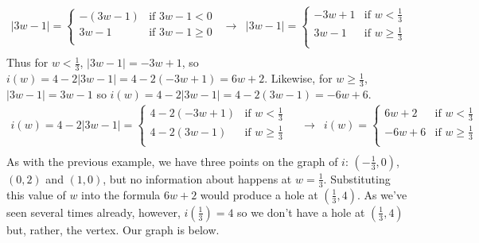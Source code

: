 \documentclass{ximera}
\begin{document}
\begin{example}
\begin{enumerate}
\[\begin{array}{ccc}
 |3w - 1|  = \begin{cases} 
      -(3w - 1) &  \text{if $3w - 1  < 0$} \\
     3w - 1  & \text{if $3w - 1 \geq 0$} \\
   \end{cases}
   
 &
 
 \longrightarrow
 
 &
 
 |3w - 1|  =   \begin{cases} 
     -3w + 1 &  \text{if $w <  {\textstyle \frac{1}{3}}$ } \\
    3w - 1  & \text{if $w \geq  {\textstyle \frac{1}{3}}$} \\
   \end{cases} \\ 
   
   \end{array}  \] Thus for $w <  \frac{1}{3}$, $|3w - 1| = -3w + 1$, so $i(w) = 4 - 2|3w - 1| = 4 - 2(-3w + 1) = 6w + 2$.  Likewise, for $w \geq  \frac{1}{3}$, $|3w - 1| = 3w - 1$ so $i(w) = 4 - 2|3w - 1|  = 4 - 2(3w - 1) = -6w + 6$. \[ \begin{array}{ccc}

 i(w)  =  4 - 2 |3w - 1| =  \begin{cases} 
    4 - 2(-3w + 1) &  \text{if $w < {\textstyle \frac{1}{3}}$ } \\
   4 - 2(3w - 1)  & \text{if $w \geq {\textstyle \frac{1}{3}}$} \\
   \end{cases} 
   
 &
 
 \longrightarrow
 
 &
 
i(w)  =   \begin{cases} 
    6w + 2  &  \text{if $w < {\textstyle \frac{1}{3}}$ } \\
    -6w + 6   & \text{if $w \geq {\textstyle \frac{1}{3}}$} \\
   \end{cases} \\ 
   
   \end{array}  \] As with the previous example, we have three points on the graph of $i$: $\left(-\frac{1}{3}, 0 \right)$, $(0, 2)$ and  $(1, 0)$, but no information about happens at $w = \frac{1}{3}$.  Substituting this value of $w$ into the formula $6w + 2$ would produce a hole at $\left(\frac{1}{3}, 4\right)$.  As we've seen several times already, however, $i\left(\frac{1}{3}\right) = 4$ so we don't have a hole at $\left(\frac{1}{3}, 4\right)$ but, rather, the vertex.    Our graph is below.


\end{enumerate}
\end{example}
\end{document}
